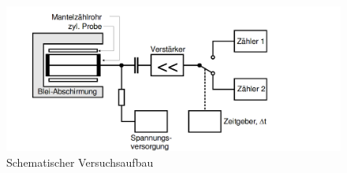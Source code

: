 \begin{figure}
  \centering
  \includegraphics[width=\textwidth]{V702_Aufbau.png}
  \caption{Schematischer Versuchsaufbau\cite{anleitung01}}
  \label{fig:Aufbau}
\end{figure}

\newpage

\printbibliography


